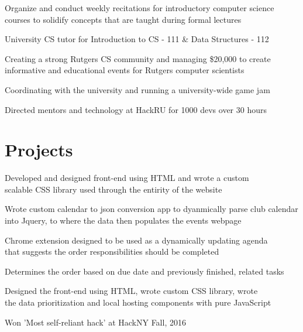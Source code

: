 \documentclass[]{deedy-resume-openfont}
\begin{document}
\begin{minipage}[t]{0.66\textwidth}
\begin{tightemize}
\item Organize and conduct weekly recitations for introductory computer science courses to solidify concepts that are taught during formal lectures
\item University CS tutor for Introduction to CS - 111 \& Data Structures - 112
\end{tightemize}
\sectionsep

\begin{tightemize}
\item Creating a strong Rutgers CS community and managing \$20,000 to create informative and educational events for Rutgers computer scientists
\item Coordinating with the university and running a university-wide  game jam
\item Directed mentors and technology at HackRU for 1000 devs over 30 hours
\end{tightemize}
\sectionsep


\section{Projects}
\begin{tightemize}
\item Developed and designed front-end using HTML and wrote a custom\\ scalable CSS library used through the entirity of the website 
\item Wrote custom calendar to json conversion app to dyanmically parse club calendar into Jquery, to where the data then populates the events webpage 
\end{tightemize}
\sectionsep

\begin{tightemize}
\item Chrome extension designed to be used as a dynamically updating agenda \\that suggests the order responsibilities should be completed 
\item Determines the order based on due date and previously finished, related tasks
\item Designed the front-end using HTML, wrote custom CSS library, wrote \\the data prioritization and local hosting components with pure JavaScript 
\item Won 'Most self-reliant hack' at HackNY Fall, 2016
\end{tightemize}
\sectionsep


\end{minipage}
\end{document}
